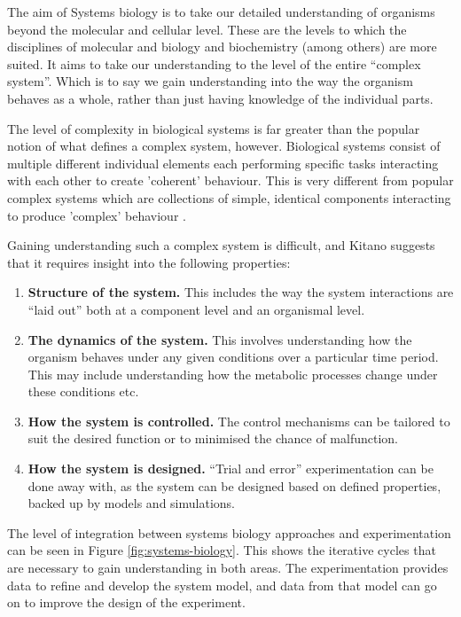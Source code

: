 The aim of Systems biology is to take our detailed understanding of organisms beyond the molecular and cellular level. These are the levels to which the disciplines of molecular and biology and biochemistry (among others) are more suited. It aims to take our understanding to the level of the entire ``complex system''. Which is to say we gain understanding into the way the organism behaves as a whole, rather than just having knowledge of the individual parts.

The level of complexity in biological systems is far greater than the popular notion of what defines a complex system, however. Biological systems consist of multiple different individual elements each performing specific tasks interacting with each other to create 'coherent' behaviour. This is very different from popular complex systems which are collections of simple, identical components interacting to produce 'complex' behaviour \cite{Kitano2002}.

Gaining understanding such a complex system is difficult, and Kitano suggests that it requires insight into the following properties\cite{Kitano2002a}:
\begin{enumerate}
 \item {\bf Structure of the system.} This includes the way the system interactions are ``laid out'' both at a component level and an organismal level.
 \item {\bf The dynamics of the system.} This involves understanding how the organism behaves under any given conditions over a particular time period. This may include understanding how the metabolic processes change under these conditions etc.
 \item {\bf How the system is controlled.} The control mechanisms can be tailored to suit the desired function or to minimised the chance of malfunction.
 \item {\bf How the system is designed.} ``Trial and error'' experimentation can be done away with, as the system can be designed based on defined properties, backed up by models and simulations.  
\end{enumerate}

The level of integration between systems biology approaches and experimentation can be seen in Figure \ref{fig:systems-biology}. This shows the iterative cycles that are necessary to gain understanding in both areas. The experimentation provides data to refine and develop the system model, and data from that model can go on to improve the design of the experiment.

